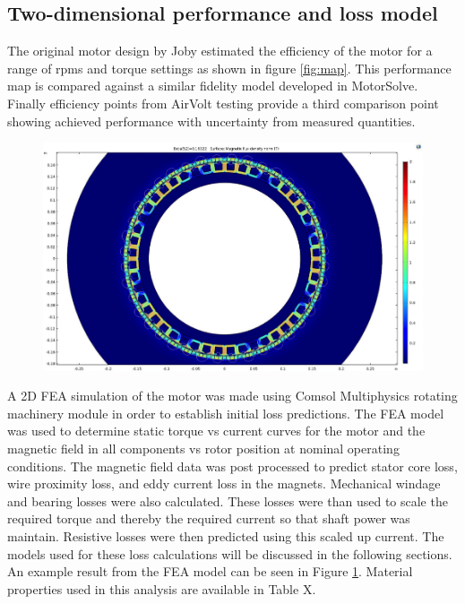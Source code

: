 \documentclass[]{aiaa-tc}%
\begin{document}
\subsection{Two-dimensional performance and loss model}

The original motor design by Joby \cite{Dubois2016} estimated the efficiency of the motor for a range of rpms and torque settings as shown in figure \ref{fig:map}. This performance map is compared against a similar fidelity model developed in MotorSolve. Finally efficiency points from AirVolt testing provide a third comparison point showing achieved performance with uncertainty from measured quantities.

\begin{figure}[!htb]%
	\centering
	\includegraphics[width=1.0\textwidth]{figures/COMSOL_EM.png}
	\caption{}
	\label{fig:COMSOL_EM}
\end{figure}


A 2D FEA simulation of the motor was made using Comsol Multiphysics rotating machinery module in order to establish initial loss predictions. The FEA model was used to determine static torque vs current curves for the motor and the magnetic field in all components vs rotor position at nominal operating conditions. The magnetic field data was post processed to predict stator core loss, wire proximity loss, and eddy current loss in the magnets. Mechanical windage and bearing losses were also calculated. These losses were than used to scale the required torque and thereby the required current so that shaft power was maintain. Resistive losses were then predicted using this scaled up current. The models used for these loss calculations will be discussed in the following sections. An example result from the FEA model can be seen in Figure \ref{fig:COMSOL_EM}. Material properties used in this analysis are available in Table X.
\end{document}
